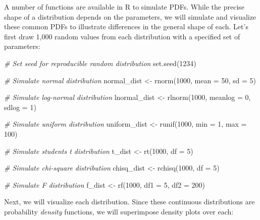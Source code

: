 \documentclass[
]{book}
\newenvironment{Shaded}{\begin{snugshade}}{\end{snugshade}}
\newcommand{\AttributeTok}[1]{\textcolor[rgb]{0.77,0.63,0.00}{#1}}
\newcommand{\CommentTok}[1]{\textcolor[rgb]{0.56,0.35,0.01}{\textit{#1}}}
\newcommand{\DecValTok}[1]{\textcolor[rgb]{0.00,0.00,0.81}{#1}}
\newcommand{\FunctionTok}[1]{\textcolor[rgb]{0.00,0.00,0.00}{#1}}
\newcommand{\NormalTok}[1]{#1}
\newcommand{\OtherTok}[1]{\textcolor[rgb]{0.56,0.35,0.01}{#1}}
\begin{document}
A number of functions are available in R to simulate PDFs. While the precise shape of a distribution depends on the parameters, we will simulate and visualize these common PDFs to illustrate differences in the general shape of each. Let's first draw 1,000 random values from each distribution with a specified set of parameters:

\begin{Shaded}
\begin{Highlighting}[]
\CommentTok{\# Set seed for reproducible random distribution}
\FunctionTok{set.seed}\NormalTok{(}\DecValTok{1234}\NormalTok{)}

\CommentTok{\# Simulate normal distribution}
\NormalTok{normal\_dist }\OtherTok{\textless{}{-}} \FunctionTok{rnorm}\NormalTok{(}\DecValTok{1000}\NormalTok{, }\AttributeTok{mean =} \DecValTok{50}\NormalTok{, }\AttributeTok{sd =} \DecValTok{5}\NormalTok{)}

\CommentTok{\# Simulate log{-}normal distribution}
\NormalTok{lnormal\_dist }\OtherTok{\textless{}{-}} \FunctionTok{rlnorm}\NormalTok{(}\DecValTok{1000}\NormalTok{, }\AttributeTok{meanlog =} \DecValTok{0}\NormalTok{, }\AttributeTok{sdlog =} \DecValTok{1}\NormalTok{)}

\CommentTok{\# Simulate uniform distribution}
\NormalTok{uniform\_dist }\OtherTok{\textless{}{-}} \FunctionTok{runif}\NormalTok{(}\DecValTok{1000}\NormalTok{, }\AttributeTok{min =} \DecValTok{1}\NormalTok{, }\AttributeTok{max =} \DecValTok{100}\NormalTok{) }

\CommentTok{\# Simulate student\textquotesingle{}s t distribution}
\NormalTok{t\_dist }\OtherTok{\textless{}{-}} \FunctionTok{rt}\NormalTok{(}\DecValTok{1000}\NormalTok{, }\AttributeTok{df =} \DecValTok{5}\NormalTok{)}

\CommentTok{\# Simulate chi{-}square distribution}
\NormalTok{chisq\_dist }\OtherTok{\textless{}{-}} \FunctionTok{rchisq}\NormalTok{(}\DecValTok{1000}\NormalTok{, }\AttributeTok{df =} \DecValTok{5}\NormalTok{)}

\CommentTok{\# Simulate F distribution}
\NormalTok{f\_dist }\OtherTok{\textless{}{-}} \FunctionTok{rf}\NormalTok{(}\DecValTok{1000}\NormalTok{, }\AttributeTok{df1 =} \DecValTok{5}\NormalTok{, }\AttributeTok{df2 =} \DecValTok{200}\NormalTok{)}
\end{Highlighting}
\end{Shaded}

Next, we will visualize each distribution. Since these continuous distributions are probability \emph{density} functions, we will superimpose density plots over each:
\end{document}
